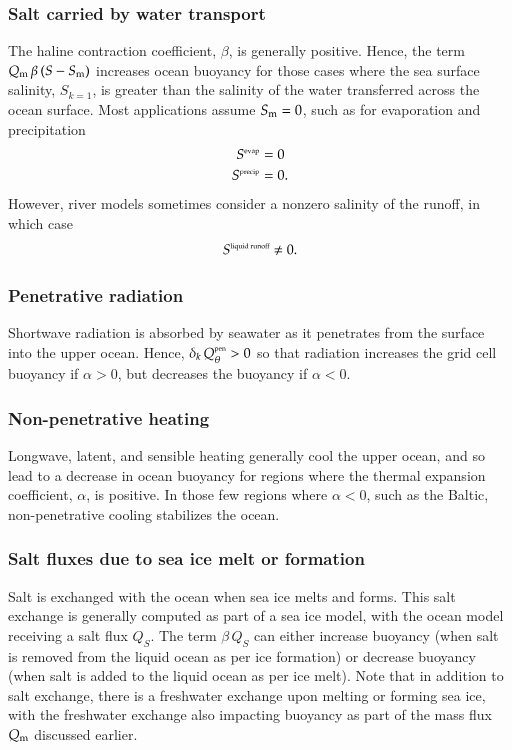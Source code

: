 \subsubsection{Salt carried by water transport}

The haline contraction coefficient, $\beta$, is generally positive.
Hence, the term $Q_{\mbox{\scriptsize m}} \, \beta \, (S - S_{\mbox{\scriptsize m}})$ increases ocean buoyancy
for those cases where the sea surface salinity, $S_{k=1}$, is greater
than the salinity of the water transferred across the ocean surface.
Most applications assume $S_{\mbox{\scriptsize m}} = 0$, such as for evaporation and
precipitation
\begin{align}
 S^{\mbox{\tiny evap}} &= 0 
\\
 S^{\mbox{\tiny precip}} &= 0.
\end{align}
 However, river models sometimes consider a nonzero salinity of the
 runoff, in which case 
\begin{equation}
 S^{\mbox{\tiny liquid runoff}} \ne 0. 
\end{equation}


\subsubsection{Penetrative radiation}

Shortwave radiation is absorbed by seawater as it penetrates from the
surface into the upper ocean. Hence, $\delta_{k} \,
Q_{\theta}^{\mbox{\tiny pen}} > 0$ so that radiation increases the
grid cell buoyancy if $\alpha > 0$, but decreases the buoyancy if
$\alpha < 0$.


\subsubsection{Non-penetrative heating}

Longwave, latent, and sensible heating generally cool the upper ocean,
and so lead to a decrease in ocean buoyancy for regions where the
thermal expansion coefficient, $\alpha$, is positive.  In those few
regions where $\alpha < 0$, such as the Baltic, non-penetrative
cooling stabilizes the ocean. 


\subsubsection{Salt fluxes due to sea ice melt or formation}

Salt is exchanged with the ocean when sea ice melts and forms.  This
salt exchange is generally computed as part of a sea ice model, with
the ocean model receiving a salt flux $Q_{S}$.  The term $\beta \,
Q_{S}$ can either increase buoyancy (when salt is removed from the
liquid ocean as per ice formation) or decrease buoyancy (when salt is
added to the liquid ocean as per ice melt).  Note that in addition to
salt exchange, there is a freshwater exchange upon melting or forming
sea ice, with the freshwater exchange also impacting buoyancy as part
of the mass flux $Q_{\mbox{\scriptsize m}}$ discussed earlier.


